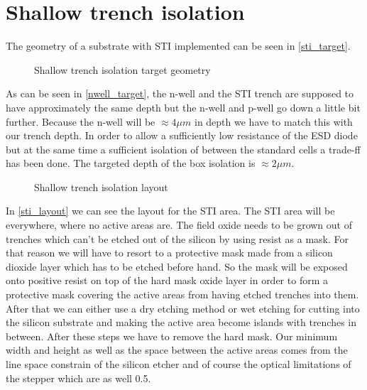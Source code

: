 \section{Shallow trench isolation}\label{sti_chapter}
The geometry of a substrate with STI implemented can be seen in \autoref{sti_target}.

\begin{figure}[H]
	\centering
	\begin{tikzpicture}[node distance = 3cm, auto, thick,scale=\CrossAndTopSectionBig, every node/.style={transform shape}]
		
	\end{tikzpicture}
	\begin{tikzpicture}[node distance = 3cm, auto, thick,scale=\CrossAndTopSectionBig, every node/.style={transform shape}]
		
	\end{tikzpicture}
	\caption{Shallow trench isolation target geometry}
	\label{sti_target}
\end{figure}

As can be seen in \autoref{nwell_target}, the n-well and the STI trench are supposed to have approximately the same depth but the n-well and p-well go down a little bit further.
Because the n-well will be $\approx 4 \mu m$ in depth we have to match this with our trench depth.
In order to allow a sufficiently low resistance of the ESD diode but at the same time a sufficient isolation of between the standard cells a trade-ff has been done.
The targeted depth of the box isolation is $\approx 2 \mu m$.

\begin{figure}[H]
	\centering
	\begin{tikzpicture}[node distance =1cm, auto, thick,scale=\VLSILayout, every node/.style={transform shape}]
		
	\end{tikzpicture}
	\caption{Shallow trench isolation layout}
	\label{sti_layout}
\end{figure}

In \autoref{sti_layout} we can see the layout for the STI area.
The STI area will be everywhere, where no active areas are.
The field oxide needs to be grown out of trenches which can't be etched out of the silicon by using resist as a mask.
For that reason we will have to resort to a protective mask made from a silicon dioxide layer which has to be etched before hand.
So the mask will be exposed onto positive resist on top of the hard mask oxide layer in order to form a protective mask covering the active areas from having etched trenches into them.
After that we can either use a dry etching method or wet etching for cutting into the silicon substrate and making the active area become islands with trenches in between.
After these steps we have to remove the hard mask.
Our minimum width and height as well as the space between the active areas comes from the line space constrain of the silicon etcher and of course the optical limitations of the stepper which are as well 0.5\um.

